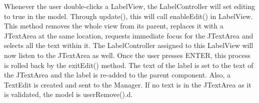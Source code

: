 \hspace{-10pt} Whenever the user double-clicks a LabelView, the LabelController will set editing to true in the model. Through update(), this will call enableEdit() in LabelView. This method removes the whole view from its parent, replaces it with a JTextArea at the same location, requests immediate focus for the JTextArea and selects all the text within it. The LabelController assigned to this LabelView will now listen to the JTextArea as well. Once the user presses ENTER, this process is rolled back by the exitEdit() method. The text of the label is set to the text of the JTextArea and the label is re-added to the parent component. Also, a TextEdit is created and sent to the Manager. If no text is in the JTextArea as it is validated, the model is userRemove().d.
